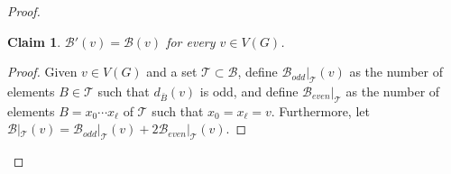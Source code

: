 \documentclass[12pt,reqno,a4paper]{amsart}
\newtheorem{claim}[theorem]{Claim}
\newcommand{\B}{\mathcal{B}}
\def\vertices{\mathop{\text{\rm vert}}\nolimits}
\begin{document}
\begin{proof}
\begin{claim}
	\(\B'(v) = \B(v)\) for every \(v\in V(G)\).
\end{claim}


\begin{proof}
Given $v\in V(G)$ and a set 
$\mathcal{T}\subset \B$, define $\B_{odd}|_\mathcal{T}(v)$ as the number of 
elements \(B\in\mathcal{T}\) such that 
\(d_{\bar B}(v)\) is odd, and define $\B_{even}|_\mathcal{T}$ as the number of 
elements \(B=x_0\cdots x_{\ell}\) of 
\(\mathcal{T}\) such that $x_0=x_\ell=v$. Furthermore, let
$\B|_\mathcal{T}(v)=\B_{odd}|_\mathcal{T}(v) + 
2\B_{even}|_\mathcal{T}(v)$.





\end{proof}
\end{proof}
\end{document}
